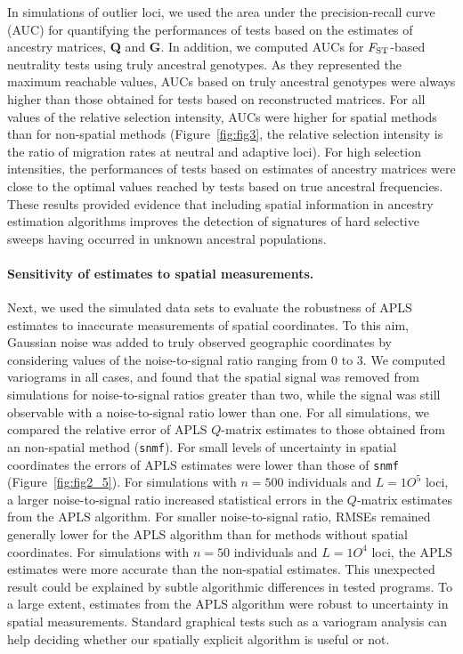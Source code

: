 In simulations of outlier loci, we used the area under the precision-recall
curve (AUC) for quantifying the performances of tests based on the estimates of
ancestry matrices, {\bf Q} and {\bf G}. In addition, we computed AUCs for
$F_{\rm ST}$-based neutrality tests using truly ancestral genotypes. As they
represented the maximum reachable values, AUCs based on truly ancestral
genotypes were always higher than those obtained for tests based on
reconstructed matrices. For all values of the relative selection intensity, AUCs
were higher for spatial methods than for non-spatial methods (Figure~\ref{fig:fig3}, the
relative selection intensity is the ratio of migration rates at neutral and
adaptive loci). For high selection intensities, the performances of tests based
on estimates of ancestry matrices were close to the optimal values reached by
tests based on true ancestral frequencies. These results provided evidence that
including spatial information in ancestry estimation algorithms improves the
detection of signatures of hard selective sweeps having occurred in unknown
ancestral populations.

\paragraph{Sensitivity of estimates to spatial measurements.} Next, we used the
simulated data sets to evaluate the robustness of APLS estimates to inaccurate
measurements of spatial coordinates. To this aim, Gaussian noise was added to
truly observed geographic coordinates by considering values of the
noise-to-signal ratio ranging from 0 to 3. We computed variograms in all cases,
and found that the spatial signal was removed from simulations for
noise-to-signal ratios greater than two, while the signal was still observable
with a noise-to-signal ratio lower than one. For all simulations, we compared
the relative error of APLS $Q$-matrix estimates to those obtained from an
non-spatial method ({\tt snmf}). For small levels of uncertainty in spatial
coordinates the errors of APLS estimates were lower than those of {\tt snmf}
(Figure~\ref{fig:fig2_5}). For simulations with $n = 500$ individuals and $L =
1O^5$ loci, a larger noise-to-signal ratio increased statistical errors in the
$Q$-matrix estimates from the APLS algorithm. For smaller noise-to-signal ratio,
RMSEs remained generally lower for the APLS algorithm than for methods without
spatial coordinates. For simulations with $n = 50$ individuals and $L = 1O^4$
loci, the APLS estimates were more accurate than the non-spatial estimates. This
unexpected result could be explained by subtle algorithmic differences in tested
programs. To a large extent, estimates from the APLS algorithm were robust to
uncertainty in spatial measurements. Standard graphical tests such as a
variogram analysis can help deciding whether our spatially explicit algorithm is
useful or not.


